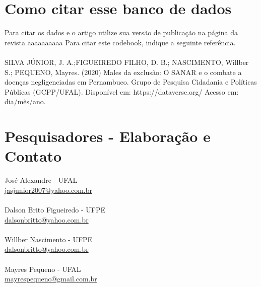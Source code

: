 \documentclass[12pt]{article}
\begin{document}
		
	\section{Como citar esse banco de dados}
	Para citar os dados e o artigo utilize sua versão de publicação na página da revista {\color{red}aaaaaaaaaa}
	Para citar este codebook, indique a seguinte referência.
	\\ \\
	SILVA JÚNIOR, J. A.;FIGUEIREDO FILHO, D. B.; NASCIMENTO, Willber S.; PEQUENO, Mayres. (2020) Males da exclusão: O SANAR e o combate a doenças negligenciadas em Pernambuco. Grupo de Pesquisa Cidadania e Políticas Públicas (GCPP/UFAL). Disponível em: https://dataverse.org/ Acesso em: dia/mês/ano. 	
	\section{Pesquisadores - Elaboração e Contato}
		José Alexandre - UFAL \\
		{\color{blue}\href{mailto}{jasjunior2007@yahoo.com.br}} 
		\\ \\
		Dalson Brito Figueiredo - UFPE \\
		{\color{blue}\href{mailto}{dalsonbritto@yahoo.com.br}}
		\\ \\
		Willber Nascimento - UFPE \\
		{\color{blue}\href{mailto}{dalsonbritto@yahoo.com.br}}
		\\ \\
		Mayres Pequeno - UFAL \\
		{\color{blue}\href{mailto}{mayrespequeno@gmail.com.br}}
\end{document}
